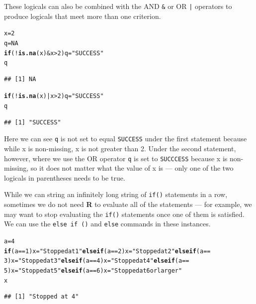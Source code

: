 \documentclass[12pt]{article}\usepackage[]{graphicx}\usepackage[]{color}
\makeatletter
\newcommand{\hlnum}[1]{\textcolor[rgb]{0.686,0.059,0.569}{#1}}%
\newcommand{\hlstr}[1]{\textcolor[rgb]{0.192,0.494,0.8}{#1}}%
\newcommand{\hlopt}[1]{\textcolor[rgb]{0,0,0}{#1}}%
\newcommand{\hlstd}[1]{\textcolor[rgb]{0.345,0.345,0.345}{#1}}%
\newcommand{\hlkwa}[1]{\textcolor[rgb]{0.161,0.373,0.58}{\textbf{#1}}}%
\newcommand{\hlkwb}[1]{\textcolor[rgb]{0.69,0.353,0.396}{#1}}%
\newcommand{\hlkwd}[1]{\textcolor[rgb]{0.737,0.353,0.396}{\textbf{#1}}}%
\newenvironment{kframe}{%
 \def\at@end@of@kframe{}%
 \ifinner\ifhmode%
  \def\at@end@of@kframe{\end{minipage}}%
  \begin{minipage}{\columnwidth}%
 \fi\fi%
 \def\FrameCommand##1{\hskip\@totalleftmargin \hskip-\fboxsep
 \colorbox{shadecolor}{##1}\hskip-\fboxsep
     \hskip-\linewidth \hskip-\@totalleftmargin \hskip\columnwidth}%
 \MakeFramed {\advance\hsize-\width
   \@totalleftmargin\z@ \linewidth\hsize
   \@setminipage}}%
 {\par\unskip\endMakeFramed%
 \at@end@of@kframe}
\newenvironment{knitrout}{}{} %
\makeatother
\begin{document}
These logicals can also be combined with the AND \verb|&| or OR \verb`|` operators to produce logicals that meet more than one criterion.
\begin{knitrout}
\color{fgcolor}\begin{kframe}
\begin{alltt}
\hlstd{x} \hlkwb{=} \hlnum{2}
\hlstd{q} \hlkwb{=} \hlnum{NA}
\hlkwa{if} \hlstd{(}\hlopt{!}\hlkwd{is.na}\hlstd{(x)} \hlopt{&} \hlstd{x} \hlopt{>} \hlnum{2}\hlstd{) q} \hlkwb{=} \hlstr{"SUCCESS"}
\hlstd{q}
\end{alltt}
\begin{verbatim}
## [1] NA
\end{verbatim}
\begin{alltt}
\hlkwa{if} \hlstd{(}\hlopt{!}\hlkwd{is.na}\hlstd{(x)} \hlopt{|} \hlstd{x} \hlopt{>} \hlnum{2}\hlstd{) q} \hlkwb{=} \hlstr{"SUCCESS"}
\hlstd{q}
\end{alltt}
\begin{verbatim}
## [1] "SUCCESS"
\end{verbatim}
\end{kframe}
\end{knitrout}

Here we can see \verb|q| is not set to equal \verb|SUCCESS| under the first statement because while x is non-missing, x is not greater than 2. Under the second statement, however, where we use the OR operator \verb|q| is set to \verb|SUCCCESS| because x is non-missing, so it does not matter what the value of x is --- only one of the two logicals in parentheses needs to be true.

While we can string an infinitely long string of \verb|if()| statements in a row, sometimes we do not need \textbf{R} to evaluate all of the statements --- for example, we may want to stop evaluating the \verb|if()| statements once one of them is satisfied. We can use the \verb|else if ()| and \verb|else| commands in these instances.
\begin{knitrout}
\color{fgcolor}\begin{kframe}
\begin{alltt}
\hlstd{a} \hlkwb{=} \hlnum{4}
\hlkwa{if} \hlstd{(a} \hlopt{==} \hlnum{1}\hlstd{) x} \hlkwb{=} \hlstr{"Stopped at 1"} \hlkwa{else if} \hlstd{(a} \hlopt{==} \hlnum{2}\hlstd{) x} \hlkwb{=} \hlstr{"Stopped at 2"} \hlkwa{else if} \hlstd{(a} \hlopt{==}
    \hlnum{3}\hlstd{) x} \hlkwb{=} \hlstr{"Stopped at 3"} \hlkwa{else if} \hlstd{(a} \hlopt{==} \hlnum{4}\hlstd{) x} \hlkwb{=} \hlstr{"Stopped at 4"} \hlkwa{else if} \hlstd{(a} \hlopt{==}
    \hlnum{5}\hlstd{) x} \hlkwb{=} \hlstr{"Stopped at 5"} \hlkwa{else if} \hlstd{(a} \hlopt{==} \hlnum{6}\hlstd{) x} \hlkwb{=} \hlstr{"Stopped at 6 or larger"}
\hlstd{x}
\end{alltt}
\begin{verbatim}
## [1] "Stopped at 4"
\end{verbatim}
\end{kframe}
\end{knitrout}
\end{document}
